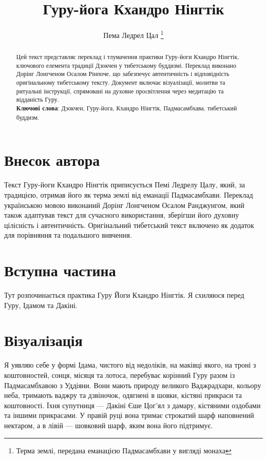 \documentclass{article}
\begin{document}
\title{Гуру-йога Кхандро Нінгтік}
\author{Пема Ледрел Цал \thanks{ Терма землі, передана еманацією Падмасамбхави у вигляді монаха }}

\maketitle

\begin{abstract}Цей текст представляє переклад і тлумачення практики Гуру-йоги Кхандро Нінгтік, ключового елемента традиції Дзокчен у тибетському буддизмі. Переклад виконано Дорінг Лонгченом Осалом Рінпоче, що забезпечує автентичність і відповідність оригінальному тибетському тексту. Документ включає візуалізації, молитви та ритуальні інструкції, спрямовані на духовне просвітлення через медитацію та відданість Гуру. \\
\textbf{Ключові слова}: Дзокчен, Гуру-йога, Кхандро Нінгтік, Падмасамбхава, тибетський буддизм.
\end{abstract}

\section*{Внесок автора}
Текст Гуру-йоги Кхандро Нінгтік приписується Пемі Ледрелу Цалу, який, за традицією, отримав його як терма землі від еманації Падмасамбхави. Переклад українською мовою виконаний Дорінг Лонгченом Осалом Ранджунгом, який також адаптував текст для сучасного використання, зберігши його духовну цілісність і автентичність. Оригінальний тибетський текст включено як додаток для порівняння та подальшого вивчення.

\tableofcontents

\vspace{1cm}

\section{Вступна частина}

Тут розпочинається практика Гуру Йоги Кхандро Нінгтік.
Я схиляюся перед Гуру, Ідамом та Дакіні.

\section{Візуалізація}

Я уявляю себе у формі Ідама, чистого від недоліків, на маківці якого,
на троні з коштовностей, сонця, місяця та лотоса, перебуває корінний
Гуру разом із Падмасамбхавою з Уддіяни. Вони мають природу великого
Ваджрадхари, кольору неба, тримають ваджру та дзвіночок, одягнені в
шовки, кістяні прикраси та коштовності. Їхня супутниця — Дакіні Єше
Цог’ял з дамару, кістяними оздобами та іншими прикрасами.
У правій руці вона тримає строкатий шарф наповнений нектаром,
а в лівій — шовковий шарф, яким вона його підтримує.
\end{document}
